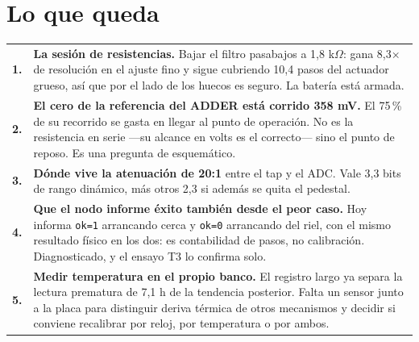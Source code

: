 \documentclass[11pt,a4paper]{article}
\begin{document}
\section{Lo que queda}

\begin{longtable}{p{1.2cm} p{14.8cm}}
\toprule
& \\
\endhead
\textbf{1.} & \textbf{La sesión de resistencias.} Bajar el filtro pasabajos a
1,8 k$\Omega$: gana 8,3× de resolución en el ajuste fino y sigue cubriendo
10,4 pasos del actuador grueso, así que por el lado de los huecos es seguro.
La batería está armada. \\[2mm]
\textbf{2.} & \textbf{El cero de la referencia del ADDER está corrido 358 mV.}
El 75\,\% de su recorrido se gasta en llegar al punto de operación. No es la
resistencia en serie ---su alcance en volts es el correcto--- sino el punto de
reposo. Es una pregunta de esquemático. \\[2mm]
\textbf{3.} & \textbf{Dónde vive la atenuación de 20:1} entre el tap y el ADC.
Vale 3,3 bits de rango dinámico, más otros 2,3 si además se quita el pedestal. \\[2mm]
\textbf{4.} & \textbf{Que el nodo informe éxito también desde el peor caso.}
Hoy informa \texttt{ok=1} arrancando cerca y \texttt{ok=0} arrancando del riel,
con el mismo resultado físico en los dos: es contabilidad de pasos, no
calibración. Diagnosticado, y el ensayo T3 lo confirma solo. \\[2mm]
\textbf{5.} & \textbf{Medir temperatura en el propio banco.} El registro largo
ya separa la lectura prematura de 7,1 h de la tendencia posterior. Falta un
sensor junto a la placa para distinguir deriva térmica de otros mecanismos y
decidir si conviene recalibrar por reloj, por temperatura o por ambos. \\
\bottomrule
\end{longtable}
\end{document}
